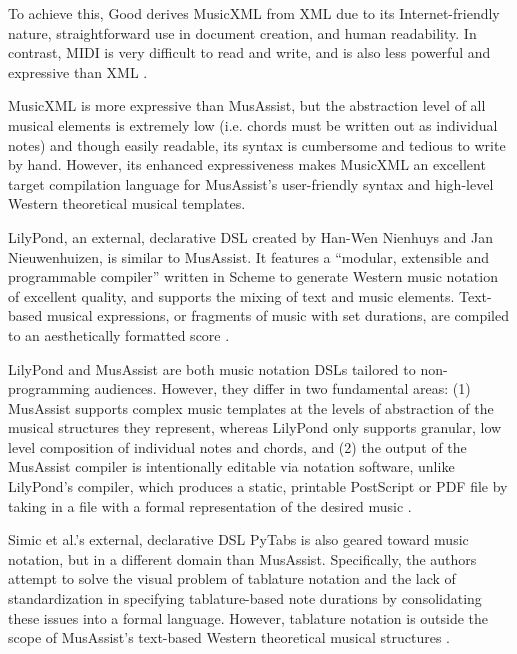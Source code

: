 \documentclass{article}
\begin{document}
To achieve this, Good derives MusicXML from XML due to its Internet-friendly nature, straightforward use in document creation, and human readability. In contrast, MIDI is very difficult to read and write, and is also less powerful and expressive than XML \cite{good_2001}.

MusicXML is more expressive than MusAssist, but the abstraction level of all musical elements is extremely low (i.e. chords must be written out as individual notes) and though easily readable, its syntax is cumbersome and tedious to write by hand. However, its enhanced expressiveness makes MusicXML an excellent target compilation language for MusAssist’s user-friendly syntax and high-level Western theoretical musical templates.

LilyPond, an external, declarative DSL created by Han-Wen Nienhuys and Jan Nieuwenhuizen, is similar to MusAssist. It features a “modular, extensible and programmable compiler” written in Scheme to generate Western music notation of excellent quality, and supports the mixing of text and music elements. Text-based musical expressions, or fragments of music with set durations, are compiled to an aesthetically formatted score \cite{nienhuys_nieuwenhuizen_2003}.

LilyPond and MusAssist are both music notation DSLs tailored to non-programming audiences. However, they differ in two fundamental areas: (1) MusAssist supports complex music templates at the levels of abstraction of the musical structures they represent, whereas LilyPond only supports granular, low level composition of individual notes and chords, and (2) the output of the MusAssist compiler is intentionally editable via notation software, unlike LilyPond’s compiler, which produces a static, printable PostScript or PDF file by taking in a file with a formal representation of the desired music 
\cite{nienhuys_nieuwenhuizen_2003}.

Simic et al.’s external, declarative DSL PyTabs is also geared toward music notation, but in a different domain than MusAssist. Specifically, the authors attempt to solve the visual problem of tablature notation and the lack of standardization in specifying tablature-based note durations by consolidating these issues into a formal language. However, tablature notation is outside the scope of MusAssist's text-based Western theoretical musical structures 
 \cite{simic_bal_dejanovic_vaderna}.

\end{document}
